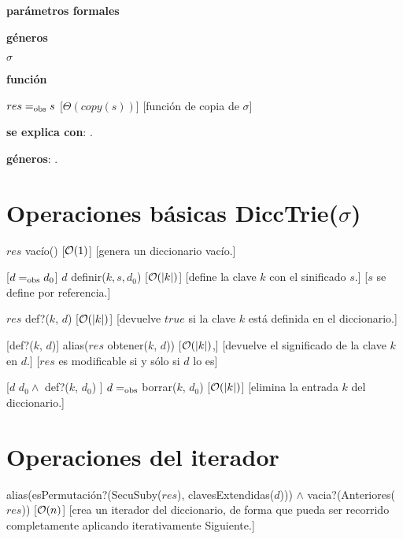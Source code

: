 \begin{Interfaz}
  \textbf{parámetros formales}\parindent\\
  \parbox{1.7cm}{\textbf{géneros}} $\sigma$\\
  \parbox[t]{1.7cm}{\textbf{función}}\parbox[t]{\textwidth-2\parindent-1.7cm}{    	
    {$res =_{\mathrm{obs}} s$}
    [$\Theta(copy(s))$]
    [función de copia de $\sigma$]
    }
      
  \textbf{se explica con}: .

  \textbf{géneros}: .

  \section*{Operaciones básicas DiccTrie($\sigma$)}

  {$res$ \igobs vacío()}
  [$\mathcal{O}(1)$]
  [genera un diccionario vacío.]

  [$d =_{\mathrm{obs}} d_0$]  
  {$d$ \igobs definir($k, s, d_0$)}
  [$\mathcal{O}(|k|)$]
  [define la clave $k$ con el sinificado $s$.]
  [$s$ se define por referencia.]
    
  {$res$ \igobs def?($k$, $d$) }
  [$\mathcal{O}(|k|)$]
  [devuelve $true$ si la clave $k$ está definida en el diccionario.]
  
  [def?($k$, $d$)]  
  {alias($res$ \igobs obtener($k$, $d$))}
  [$\mathcal{O}(|k|)$,]
  [devuelve el significado de la clave $k$ en $d$.]
  [$res$ es modificable si y sólo si $d$ lo es]
  
  [$d$ \igobs $d_0 \land$ def?($k$, $d_0$) ]
  {$d =_{\mathrm{obs}}$ borrar($k$, $d_0$)}
  [$\mathcal{O}(|k|)$]
  [elimina la entrada $k$ del diccionario.] 
\newpage 
  \section*{Operaciones del iterador}

  {alias(esPermutación?(SecuSuby($res$), clavesExtendidas($d$))) $\land$ vacia?(Anteriores($res$))}
  [$\mathcal{O}(n)$]
  [crea un iterador del diccionario, de forma que pueda ser recorrido completamente aplicando iterativamente Siguiente.]
  

\end{Interfaz}
